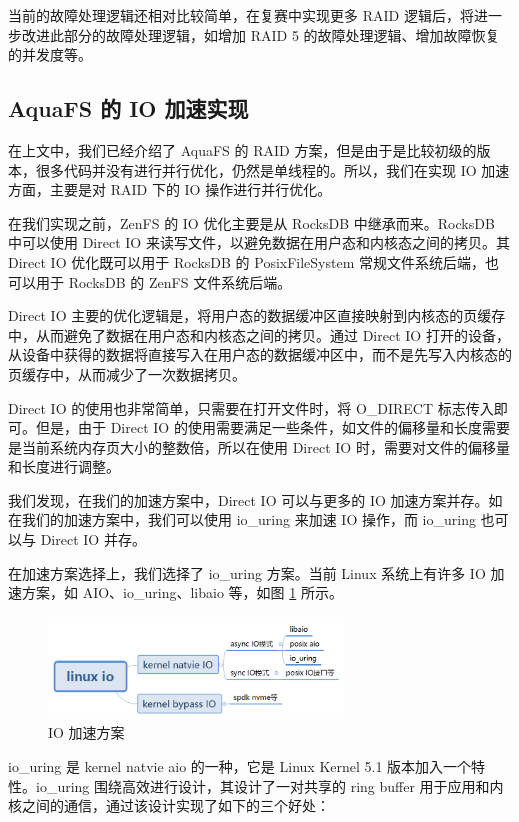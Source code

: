 当前的故障处理逻辑还相对比较简单，在复赛中实现更多 RAID 逻辑后，将进一步改进此部分的故障处理逻辑，如增加 RAID 5 的故障处理逻辑、增加故障恢复的并发度等。

\subsection{AquaFS 的 IO 加速实现}

在上文中，我们已经介绍了 AquaFS 的 RAID 方案，但是由于是比较初级的版本，很多代码并没有进行并行优化，仍然是单线程的。所以，我们在实现 IO 加速方面，主要是对 RAID 下的 IO 操作进行并行优化。

在我们实现之前，ZenFS 的 IO 优化主要是从 RocksDB 中继承而来。RocksDB 中可以使用 Direct IO 来读写文件，以避免数据在用户态和内核态之间的拷贝。其 Direct IO 优化既可以用于 RocksDB 的 PosixFileSystem 常规文件系统后端，也可以用于 RocksDB 的 ZenFS 文件系统后端。

Direct IO 主要的优化逻辑是，将用户态的数据缓冲区直接映射到内核态的页缓存中，从而避免了数据在用户态和内核态之间的拷贝。通过 Direct IO 打开的设备，从设备中获得的数据将直接写入在用户态的数据缓冲区中，而不是先写入内核态的页缓存中，从而减少了一次数据拷贝。

Direct IO 的使用也非常简单，只需要在打开文件时，将 O\_DIRECT 标志传入即可。但是，由于 Direct IO 的使用需要满足一些条件，如文件的偏移量和长度需要是当前系统内存页大小的整数倍，所以在使用 Direct IO 时，需要对文件的偏移量和长度进行调整。

我们发现，在我们的加速方案中，Direct IO 可以与更多的 IO 加速方案并存。如在我们的加速方案中，我们可以使用 io\_uring 来加速 IO 操作，而 io\_uring 也可以与 Direct IO 并存。

在加速方案选择上，我们选择了 io\_uring 方案。当前 Linux 系统上有许多 IO 加速方案，如 AIO、io\_uring、libaio 等，如图 \ref{io-speedup} 所示。

\begin{figure}[htbp]
  \centering
  \includegraphics[width=0.7\textwidth]{fig/io-speedup}
  \caption{IO 加速方案}
  \label{io-speedup}
\end{figure}

io\_uring 是 kernel natvie aio 的一种，它是 Linux Kernel 5.1 版本加入一个特性。io\_uring 围绕高效进行设计，其设计了一对共享的 ring buffer 用于应用和内核之间的通信，通过该设计实现了如下的三个好处：

